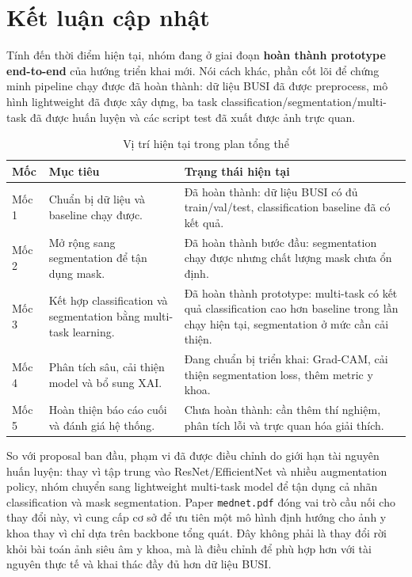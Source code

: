 \documentclass[12pt,a4paper]{article}
\begin{document}
\section{Kết luận cập nhật}

Tính đến thời điểm hiện tại, nhóm đang ở giai đoạn \textbf{hoàn thành prototype end-to-end} của hướng triển khai mới. Nói cách khác, phần cốt lõi để chứng minh pipeline chạy được đã hoàn thành: dữ liệu BUSI đã được preprocess, mô hình lightweight đã được xây dựng, ba task classification/segmentation/multi-task đã được huấn luyện và các script test đã xuất được ảnh trực quan.

\begin{table}[H]
\centering
\caption{Vị trí hiện tại trong plan tổng thể}
\renewcommand{\arraystretch}{1.25}
\begin{tabular}{p{3.2cm} p{5.4cm} p{6.2cm}}
\toprule
\textbf{Mốc} & \textbf{Mục tiêu} & \textbf{Trạng thái hiện tại} \\
\midrule
Mốc 1 & Chuẩn bị dữ liệu và baseline chạy được. & Đã hoàn thành: dữ liệu BUSI có đủ train/val/test, classification baseline đã có kết quả. \\
Mốc 2 & Mở rộng sang segmentation để tận dụng mask. & Đã hoàn thành bước đầu: segmentation chạy được nhưng chất lượng mask chưa ổn định. \\
Mốc 3 & Kết hợp classification và segmentation bằng multi-task learning. & Đã hoàn thành prototype: multi-task có kết quả classification cao hơn baseline trong lần chạy hiện tại, segmentation ở mức cần cải thiện. \\
Mốc 4 & Phân tích sâu, cải thiện model và bổ sung XAI. & Đang chuẩn bị triển khai: Grad-CAM, cải thiện segmentation loss, thêm metric y khoa. \\
Mốc 5 & Hoàn thiện báo cáo cuối và đánh giá hệ thống. & Chưa hoàn thành: cần thêm thí nghiệm, phân tích lỗi và trực quan hóa giải thích. \\
\bottomrule
\end{tabular}
\end{table}

So với proposal ban đầu, phạm vi đã được điều chỉnh do giới hạn tài nguyên huấn luyện: thay vì tập trung vào ResNet/EfficientNet và nhiều augmentation policy, nhóm chuyển sang lightweight multi-task model để tận dụng cả nhãn classification và mask segmentation. Paper \texttt{mednet.pdf} đóng vai trò cầu nối cho thay đổi này, vì cung cấp cơ sở để ưu tiên một mô hình định hướng cho ảnh y khoa thay vì chỉ dựa trên backbone tổng quát. Đây không phải là thay đổi rời khỏi bài toán ảnh siêu âm y khoa, mà là điều chỉnh để phù hợp hơn với tài nguyên thực tế và khai thác đầy đủ hơn dữ liệu BUSI.
\end{document}
